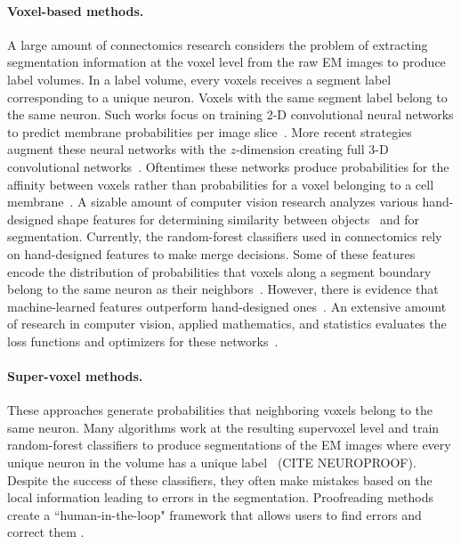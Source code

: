 \paragraph{Voxel-based methods.} 
A large amount of connectomics research considers the problem of extracting segmentation information at the voxel level from the raw EM images to produce label volumes.
In a label volume, every voxels receives a segment label corresponding to a unique neuron.
Voxels with the same segment label belong to the same neuron. 
Such works focus on training 2-D convolutional neural networks to predict membrane probabilities per image slice~\cite{ciresan2012deep,jain2010boundary,amelio_segmentation,rhoananet,kaynig2015large}. 
More recent strategies augment these neural networks with the $z$-dimension creating full 3-D convolutional networks~\cite{lee2015recursive}.
Oftentimes these networks produce probabilities for the affinity between voxels rather than probabilities for a voxel belonging to a cell membrane~\cite{ronneberger2015u}. 
A sizable amount of computer vision research analyzes various hand-designed shape features for determining similarity between objects~\cite{osada2002shape} and for segmentation\cite{conners1984segmentation}. 
Currently, the random-forest classifiers used in connectomics rely on hand-designed features to make merge decisions.
Some of these features encode the distribution of probabilities that voxels along a segment boundary belong to the same neuron as their neighbors~\cite{nunez2014graph,ren2003learning}.
However, there is evidence that machine-learned features outperform hand-designed ones~\cite{bogovic2013learned}.
An extensive amount of research in computer vision, applied mathematics, and statistics evaluates the loss functions and optimizers for these networks~\cite{chatfield2014return,maas2013rectifier,nesterov1983method}. 

\paragraph{Super-voxel methods.} 
These approaches generate probabilities that neighboring voxels belong to the same neuron.
Many algorithms work at the resulting supervoxel level and train random-forest classifiers to produce segmentations of the EM images where every unique neuron in the volume has a unique label~\cite{seymour2016rhoananet,nunez2014graph,parag2017anisotropic,zlateski2015image} (CITE NEUROPROOF). 
Despite the success of these classifiers, they often make mistakes based on the local information leading to errors in the segmentation. 
Proofreading methods create a ``human-in-the-loop" framework that allows users to find errors and correct them \cite{haehn2017scalable,haehn2017guided,haehn2014design,error_correction_using_CNN}. 

